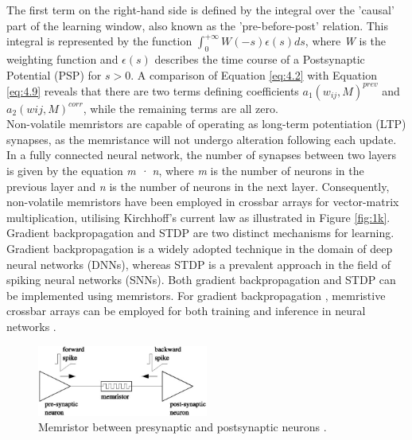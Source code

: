 \noindent The first term on the right-hand side is defined by the integral over the 'causal' part of the learning window, also known as the 'pre-before-post' relation. This integral is represented by the function $\int_{0}^{+\infty } W(-s)\epsilon(s)ds$, where \textit{W} is the weighting function and $\epsilon (s)$ describes the time course of a Postsynaptic Potential (PSP) for $s > 0$. A comparison of Equation \ref{eq:4.2} with Equation \ref{eq:4.9} reveals that there are two terms defining coefficients $a_1(w_{ij},M)^{prev}$ and $a_2(wij,M)^{corr}$, while the remaining terms are all zero. \\

\noindent Non-volatile memristors are capable of operating as long-term potentiation (LTP) synapses, as the memristance will not undergo alteration following each update. In a fully connected neural network, the number of synapses between two layers is given by the equation \textit{m · n}, where \textit{m} is the number of neurons in the previous layer and \textit{n} is the number of neurons in the next layer. Consequently, non-volatile memristors have been employed in crossbar arrays for vector-matrix multiplication, utilising Kirchhoff's current law as illustrated in Figure \ref{fig:1k}. \\

\noindent Gradient backpropagation and STDP are two distinct mechanisms for learning. Gradient backpropagation is a widely adopted technique in the domain of deep neural networks (DNNs), whereas STDP is a prevalent approach in the field of spiking neural networks (SNNs). Both gradient backpropagation and STDP can be implemented using memristors. For gradient backpropagation \cite{hasan2017chip}, memristive crossbar arrays can be employed for both training and inference in neural networks \cite{ankit2019puma}.\\

\begin{figure}[htbp!] 
\centering    
\includegraphics[width=0.5\textwidth]{Chapter4/Figs/4b.png}
\caption[Memristor between presynaptic and postsynaptic neurons.]{Memristor between presynaptic and postsynaptic neurons \cite{huang2018memristor}.}
\label{fig:4b}
\end{figure}


